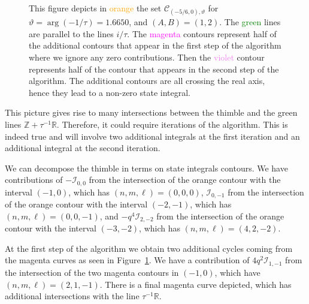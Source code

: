 \documentclass[12pt,reqno]{amsart}
\theoremstyle{definition}
\def\BZ{\mathbb Z}
\def\BR{\mathbb R}
\def\calI{\mathcal I}
\def\calC{\mathcal C}
\renewcommand{\=}{\;=\;}
\begin{document}
\begin{figure}[ht]
\begin{tiny}
\begin{tikzpicture}[scale=2]
\end{tikzpicture}
\end{tiny}
\caption{This figure depicts in \textcolor{orange}{orange} the set $\calC_{(-5/6,0),\vartheta}$ for $\vartheta=\arg(-1/\tau)=1.6650$, and $(A,B)=(1,2)$. The \textcolor{green}{green} lines are parallel to the lines $i/\tau$. The \textcolor{magenta}{magenta} contours represent half of the additional contours that appear in the first step of the algorithm where we ignore any zero contributions. Then the \textcolor{violet}{violet} contour represents half of the contour that appears in the second step of the algorithm. The additional contours are all crossing the real axis, hence they lead to a non-zero state integral.
}\label{fig:thimb.41.III.t1}
\end{figure}
This picture gives rise to many intersections between the thimble and the green lines $\BZ+\tau^{-1}\BR$. Therefore, it could require iterations of the algorithm. This is indeed true and will involve two additional integrals at the first iteration and an additional integral at the second iteration.

\medskip

We can decompose the thimble in terms on state integrals contours. We have contributions of $-\calI_{0,0}$ from the intersection of the orange contour with the interval $(-1,0)$, which has $(n,m,\ell)=(0,0,0)$, $\calI_{0,-1}$ from the intersection of the orange contour with the interval $(-2,-1)$, which has $(n,m,\ell)=(0,0,-1)$, and $-q^4\calI_{2,-2}$ from the intersection of the orange contour with the interval $(-3,-2)$, which has $(n,m,\ell)=(4,2,-2)$.

\medskip

At the first step of the algorithm we obtain two additional cycles coming from the magenta curves as seen in Figure~\ref{fig:thimb.41.III.t1}. We have a contribution of $4q^2\calI_{1,-1}$ from the intersection of the two magenta contours in $(-1,0)$, which have $(n,m,\ell)=(2,1,-1)$. There is a final magenta curve depicted, which has additional intersections with the line $\tau^{-1}\BR$.

\medskip
\end{document}
